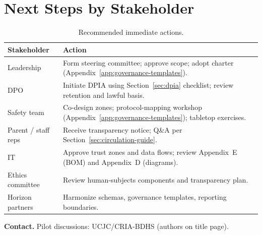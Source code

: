 \section{Next Steps by Stakeholder}
\label{sec:conclusion-req}

\begin{table}[htbp]
  \centering
  \caption{Recommended immediate actions.}
  \label{tab:next-steps}
  \small
  \begin{tabular}{@{}p{2.8cm}p{8.2cm}@{}}
    \toprule
    Stakeholder & Action \\
    \midrule
    Leadership &
      Form steering committee; approve scope; adopt charter (Appendix~\ref{app:governance-templates}). \\
    DPO &
      Initiate DPIA using Section~\ref{sec:dpia} checklist; review retention and lawful basis. \\
    Safety team &
      Co-design zones; protocol-mapping workshop (Appendix~\ref{app:governance-templates});
      tabletop exercises. \\
    Parent / staff reps &
      Receive transparency notice; Q\&A per Section~\ref{sec:circulation-guide}. \\
    IT &
      Approve trust zones and data flows; review Appendix~E (BOM) and Appendix~D (diagrams). \\
    Ethics committee &
      Review human-subjects components and transparency plan. \\
    Horizon partners &
      Harmonize schemas, governance templates, reporting boundaries. \\
    \bottomrule
  \end{tabular}
\end{table}

\vspace{0.5em}
\noindent\textbf{Contact.} Pilot discussions: UCJC/CRIA-BDHS (authors on title page).
